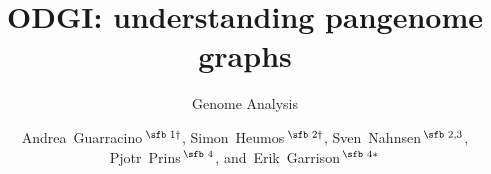 \documentclass{bioinfo}
\begin{document}

\subtitle{Genome Analysis}

\title[ODGI: understanding pangenome graphs]{ODGI: understanding pangenome graphs}
\author[Guarracino, Heumos \textit{et~al}.]{
Andrea~Guarracino\,$^{\text{\sfb 1} \dagger}$,
Simon~Heumos\,$^{\text{\sfb 2} \dagger}$,
Sven~Nahnsen\,$^{\text{\sfb 2,3}}$,
Pjotr~Prins\,$^{\text{\sfb 4}}$,
and~Erik~Garrison\,$^{\text{\sfb 4}*}$
}

\address{
$^{\text{\sf 1}}$Genomics Research Centre, Human Technopole, Milan, Italy \\
$^{\text{\sf 2}}$Quantitative Biology Center (QBiC), University of T\"ubingen, T\"ubingen, Germany, 72076 \\
$^{\text{\sf 3}}$Biomedical Data Science, Dept. of Computer Science, University of T\"ubingen, T\"ubingen, Germany, 72076 \\
$^{\text{\sf 4}}$University of Tennessee Health Science Center, Memphis, TN, USA
}




\end{document}
